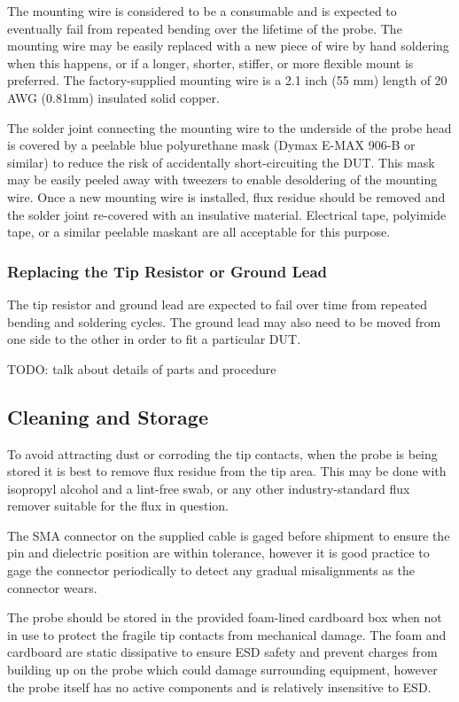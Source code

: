 \documentclass[11pt]{article}
\begin{document}
The mounting wire is considered to be a consumable and is expected to eventually fail from repeated
bending over the lifetime of the probe. The mounting wire may be easily replaced with a new piece of
wire by hand soldering when this happens, or if a longer, shorter, stiffer, or more flexible mount is preferred. The
factory-supplied mounting wire is a 2.1 inch (55 mm) length of 20 AWG (0.81mm) insulated solid copper.

The solder joint connecting the mounting wire to the underside of the probe head is covered by a peelable blue
polyurethane mask (Dymax E-MAX 906-B or similar) to reduce the risk of accidentally short-circuiting the DUT. This mask
may be easily peeled away with tweezers to enable desoldering of the mounting wire. Once a new mounting wire is
installed, flux residue should be removed and the solder joint re-covered with an insulative material. Electrical tape,
polyimide tape, or a similar peelable maskant are all acceptable for this purpose.

\subsubsection{Replacing the Tip Resistor or Ground Lead}

The tip resistor and ground lead are expected to fail over time from repeated bending and soldering cycles. The ground
lead may also need to be moved from one side to the other in order to fit a particular DUT.

TODO: talk about details of parts and procedure

\subsection{Cleaning and Storage}

To avoid attracting dust or corroding the tip contacts, when the probe is being stored it is best to remove flux
residue from the tip area. This may be done with isopropyl alcohol and a lint-free swab, or any other industry-standard
flux remover suitable for the flux in question.

The SMA connector on the supplied cable is gaged before shipment to ensure the pin and dielectric position are within
tolerance, however it is good practice to gage the connector periodically to detect any gradual misalignments as the
connector wears.

The probe should be stored in the provided foam-lined cardboard box when not in use to protect the fragile tip contacts
from mechanical damage. The foam and cardboard are static dissipative to ensure ESD safety and prevent charges from
building up on the probe which could damage surrounding equipment, however the probe itself has no active components
and is relatively insensitive to ESD.
\end{document}
